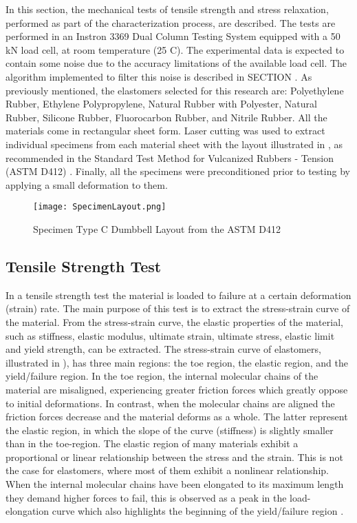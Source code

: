 In this section, the mechanical tests of tensile strength and stress relaxation, performed as part of the characterization process, are described. The tests are performed in an Instron 3369 Dual Column Testing System equipped with a 50 kN load cell, at room temperature (25 \degree{} C). The experimental data is expected to contain some noise due to the accuracy limitations of the available load cell. The algorithm implemented to filter this noise is described in SECTION . As previously mentioned, the elastomers selected for this research are: Polyethylene Rubber, Ethylene Polypropylene, Natural Rubber with Polyester, Natural Rubber, Silicone Rubber, Fluorocarbon Rubber, and Nitrile Rubber. All the materials come in rectangular sheet form. Laser cutting was used to extract individual specimens from each material sheet with the layout illustrated in , as recommended in the Standard Test Method for Vulcanized Rubbers - Tension (ASTM D412) \cite{astmd412}. Finally, all the specimens were preconditioned prior to testing by applying a small deformation to them.

\begin{figure}[htb!]
    \centering
    \texttt{[image: SpecimenLayout.png]}
    \caption{Specimen Type C Dumbbell Layout from the ASTM D412 \cite{astmd412}}
    \label{fig:specimenLayout}
\end{figure}

\subsection{Tensile Strength Test}

In a tensile strength test the material is loaded to failure at a certain deformation (strain) rate. The main purpose of this test is to extract the stress-strain curve of the material. From the stress-strain curve, the elastic properties of the material, such as stiffness, elastic modulus, ultimate strain, ultimate stress, elastic limit and yield strength, can be extracted. The stress-strain curve of elastomers, illustrated in  ), has three main regions: the toe region, the elastic region, and the yield/failure region. In the toe region, the internal molecular chains of the material are misaligned, experiencing greater friction forces which greatly oppose to initial deformations. In contrast, when the molecular chains are aligned the friction forces decrease and the material deforms as a whole. The latter represent the elastic region, in which the slope of the curve (stiffness) is slightly smaller than in the toe-region. The elastic region of many materials exhibit a proportional or linear relationship between the stress and the strain. This is not the case for elastomers, where most of them exhibit a nonlinear relationship. When the internal molecular chains have been elongated to its maximum length they demand higher forces to fail, this is observed as a peak in the load-elongation curve which also highlights the beginning of the yield/failure region \cite{Bauman2008}.

